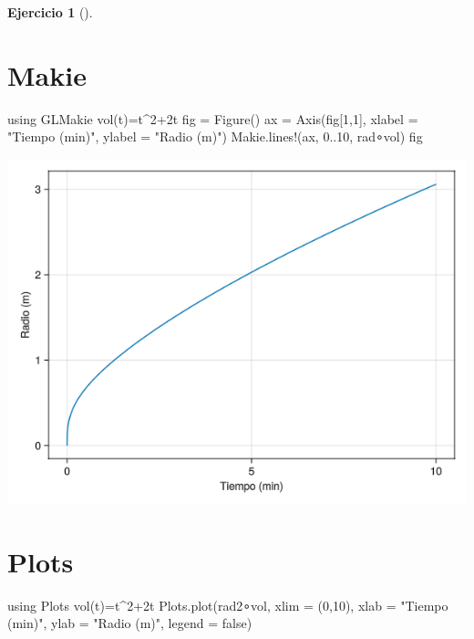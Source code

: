 \documentclass[
  a4paper,
]{scrreport}
\newenvironment{Shaded}{\begin{snugshade}}{\end{snugshade}}
\newcommand{\BuiltInTok}[1]{\textcolor[rgb]{0.00,0.23,0.31}{#1}}
\newcommand{\ConstantTok}[1]{\textcolor[rgb]{0.56,0.35,0.01}{#1}}
\newcommand{\FloatTok}[1]{\textcolor[rgb]{0.68,0.00,0.00}{#1}}
\newcommand{\FunctionTok}[1]{\textcolor[rgb]{0.28,0.35,0.67}{#1}}
\newcommand{\ImportTok}[1]{\textcolor[rgb]{0.00,0.46,0.62}{#1}}
\newcommand{\NormalTok}[1]{\textcolor[rgb]{0.00,0.23,0.31}{#1}}
\newcommand{\OperatorTok}[1]{\textcolor[rgb]{0.37,0.37,0.37}{#1}}
\newcommand{\StringTok}[1]{\textcolor[rgb]{0.13,0.47,0.30}{#1}}
\theoremstyle{definition}
\newtheorem{exercise}{Ejercicio}[chapter]
\theoremstyle{remark}
\begin{document}
\begin{exercise}[]
\begin{enumerate}
\begin{tcolorbox}
  \section{Makie}

\begin{Shaded}
\begin{Highlighting}[]
\ImportTok{using} \BuiltInTok{GLMakie}
\FunctionTok{vol}\NormalTok{(t)}\OperatorTok{=}\NormalTok{t}\OperatorTok{\^{}}\FloatTok{2}\OperatorTok{+}\FloatTok{2}\NormalTok{t}
\NormalTok{fig }\OperatorTok{=} \FunctionTok{Figure}\NormalTok{()}
\NormalTok{ax }\OperatorTok{=} \FunctionTok{Axis}\NormalTok{(fig[}\FloatTok{1}\NormalTok{,}\FloatTok{1}\NormalTok{], xlabel }\OperatorTok{=} \StringTok{"Tiempo (min)"}\NormalTok{, ylabel }\OperatorTok{=} \StringTok{"Radio (m)"}\NormalTok{)}
\NormalTok{Makie.}\FunctionTok{lines!}\NormalTok{(ax, }\FloatTok{0}\OperatorTok{..}\FloatTok{10}\NormalTok{, rad}\OperatorTok{∘}\NormalTok{vol)}
\NormalTok{fig}
\end{Highlighting}
\end{Shaded}

  \includegraphics{03-funciones-elementales_files/figure-pdf/cell-15-output-1.png}

  \section{Plots}

\begin{Shaded}
\begin{Highlighting}[]
\ImportTok{using} \BuiltInTok{Plots}
\FunctionTok{vol}\NormalTok{(t)}\OperatorTok{=}\NormalTok{t}\OperatorTok{\^{}}\FloatTok{2}\OperatorTok{+}\FloatTok{2}\NormalTok{t}
\NormalTok{Plots.}\FunctionTok{plot}\NormalTok{(rad2}\OperatorTok{∘}\NormalTok{vol, xlim }\OperatorTok{=}\NormalTok{ (}\FloatTok{0}\NormalTok{,}\FloatTok{10}\NormalTok{), xlab }\OperatorTok{=} \StringTok{"Tiempo (min)"}\NormalTok{, ylab }\OperatorTok{=} \StringTok{"Radio (m)"}\NormalTok{, legend }\OperatorTok{=} \ConstantTok{false}\NormalTok{)}
\end{Highlighting}
\end{Shaded}


\end{tcolorbox}
\end{enumerate}
\end{exercise}
\end{document}
